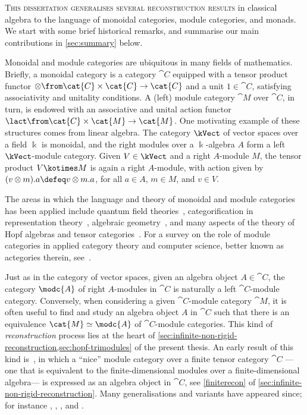 \textsc{This dissertation generalises several reconstruction results}
in classical algebra to the language of monoidal categories, module categories, and monads.
We start with some brief historical remarks,
and summarise our main contributions in \cref{sec:summary} below.

Monoidal and module categories are ubiquitous in many fields of mathematics.
Briefly, a monoidal category is a category \(\cat{C}\) equipped with a tensor product functor \(\otimes\from \cat{C} \times \cat{C} \to \cat{C}\)
and a unit \(1 \in \cat{C}\), satisfying associativity and unitality conditions.
A (left) module category \(\cat{M}\) over \(\cat{C}\), in turn,
is endowed with an associative and unital action functor \(\lact \from \cat{C} \times \cat{M} \to \cat{M}\).
One motivating example of these structures comes from linear algebra.
The category \(\kVect\) of vector spaces over a field \(\Bbbk\) is monoidal,
and the right modules over a \(\Bbbk\)\hyp{}algebra \(A\) form a left \(\kVect\)\hyp{}module category.
Given \(V \in \kVect\) and a right \(A\)\hyp{}module \(M\),
the tensor product \(V \kotimes M\) is again a right \(A\)\hyp{}module,
with action given by \((v \otimes m).a \defeq v \otimes m.a\),
for all \(a \in A\), \(m \in M\), and \(v \in V\).

The areas in which the language and theory of monoidal and module categories has been applied include
quantum field theories~\cite{fuchs02:tft-rcft,day07:assoc-rcfts},
categorification in representation theory~\cite{stroppel23:categ,liu24:soerg,stroppel24:braid-soerg},
algebraic geometry~\cite{ben-zvi10:integ-drinf,ben-zvi18:integ,pascaleff18:poiss-fukay-floer},
and many aspects of the theory of Hopf algebras and tensor categories~\cite{schauenburg00:duals-r-hopf,kowalzig14:batal-vilkov,Etingof2015,fuchs22:spher-morit-serre,shimizu23:relat-serre,stroinski24:modul-tambar}.
For a survey on the role of module categories in applied category theory and computer science,
better known as actegories therein,
see~\cite{capucci22:acteg-workin-amthem}.

Just as in the category of vector spaces,
given an algebra object \(A \in \cat{C}\),
the category \(\modc{A}\) of right \(A\)\hyp{}modules in \(\cat{C}\) is naturally a left \(\cat{C}\)\hyp{}module category.
Conversely, when considering a given \(\cat{C}\)\hyp{}module category \(\cat{M}\),
it is often useful to find and study an algebra object \(A\) in \(\cat{C}\)
such that there is an equivalence \(\cat{M} \simeq \modc{A}\) of \(\cat{C}\)\hyp{}module categories.
This kind of \emph{reconstruction} process lies at the heart of \cref{sec:infinite-non-rigid-reconstruction,sec:hopf-trimodules} of the present thesis.
An early result of this kind is~\cite[Theorem~1]{ostrik03:modul-hopf},
in which a ``nice'' module category over a finite tensor category \(\cat{C}\)%
—one that is equivalent to the finite-dimensional modules over a finite-dimensional algebra—%
is expressed as an algebra object in \(\cat{C}\),
see \cref{finiterecon} of \cref{sec:infinite-non-rigid-reconstruction}.
Many generalisations and variants have appeared since;
for instance
\cite[Theorem~7.10.1]{Etingof2015},
\cite[Theorem~2.24]{douglas19},
\cite[Theorem~4.7]{mackaay19:simpl},
and \cite[Theorem~4.6]{ben-zvi18:integ}.

